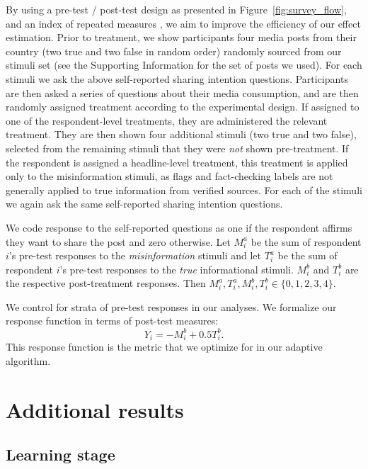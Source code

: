 \documentclass[letterpaper, 12pt, parskip=full,DIV=10]{scrartcl}
\begin{document}
By using a pre-test / post-test design \citep{davidian2005semiparametric} as presented in Figure~\ref{fig:survey_flow}, and an index of repeated measures \citep{broockman2017design}, we aim to improve the efficiency of our effect estimation. Prior to treatment, we show participants four media posts from their country (two true and two false in random order) randomly sourced from our stimuli set (see the Supporting Information for the set of posts we used). For each stimuli we ask the above self-reported sharing intention questions.  Participants are then asked a series of questions about their media consumption, and are then randomly assigned treatment according to the experimental design. If assigned to one of the respondent-level treatments, they are administered the relevant treatment. They are then shown four additional stimuli (two true and two false), selected from the remaining stimuli that they were \textit{not} shown pre-treatment. If the respondent is assigned a headline-level treatment, this treatment is applied only to the misinformation stimuli, as flags and fact-checking labels are not generally applied to true information from verified sources. For each of the stimuli we again ask the same self-reported sharing intention questions. 


We code response to the self-reported questions as one if the respondent affirms they want to share the post and zero otherwise. Let $M_i^a$ be the sum of respondent $i$'s pre-test responses to the \textit{misinformation} stimuli and let $T_i^a$ be the sum of respondent $i$'s pre-test responses to the \textit{true} informational stimuli. $M_i^b$ and $T_i^b$ are the respective post-treatment responses. Then $M_i^a, T_i^a, M_i^b, T_i^b \in \{0,1,2, 3, 4\}$. 

We control for strata of pre-test responses in our analyses. We formalize our response function in terms of post-test measures:
\[
Y_i = -M^b_i + 0.5 T^b_i.
\]
This response function is the metric that we optimize for in our adaptive algorithm.

\section{Additional results}
\subsection{Learning stage}\label{appendix:learning}
\end{document}
